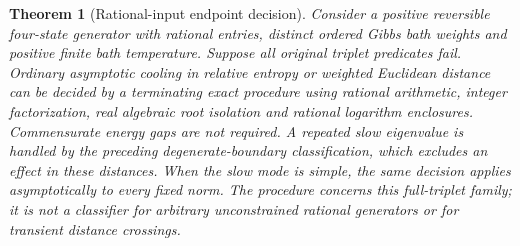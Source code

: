 \documentclass[11pt]{article}
\newtheorem{theorem}{Theorem}
\begin{document}
\begin{theorem}[Rational-input endpoint decision]
\label{thm:rationallogendpoint}
Consider a positive reversible four-state generator with rational entries,
distinct ordered Gibbs bath weights and positive finite bath temperature.
Suppose all original triplet predicates fail. Ordinary asymptotic cooling
in relative entropy or weighted Euclidean distance can be decided by a
terminating exact procedure using rational arithmetic,
integer factorization, real algebraic root isolation and rational logarithm
enclosures. Commensurate energy gaps are not required. A repeated slow
eigenvalue is handled by the preceding degenerate-boundary classification,
which excludes an effect in these distances. When the slow mode is simple,
the same decision applies asymptotically to every fixed norm.
The procedure concerns this full-triplet family;
it is not a classifier for arbitrary unconstrained rational generators or
for transient distance crossings.
\end{theorem}
\end{document}
